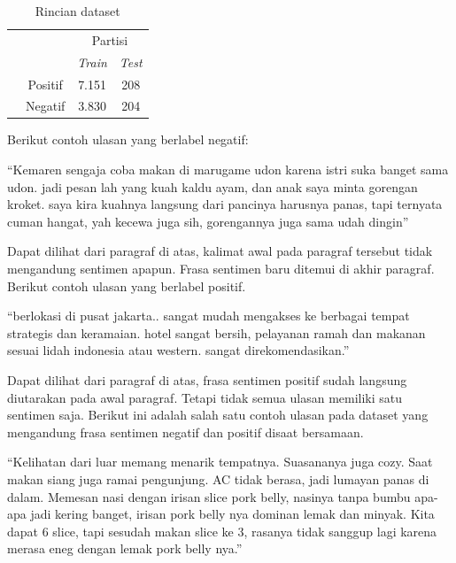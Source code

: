	\begin{table}[ht]
	    \centering
	    \caption{Rincian dataset \parencite{CrisdayantiPurwarianti2019}}
	    \begin{tabular}{@{}cc|cc@{}}
			\multicolumn{1}{c}{} &\multicolumn{1}{c}{} &\multicolumn{2}{c}{Partisi} \\ 
			\multicolumn{1}{c}{} & 
			\multicolumn{1}{c|}{} & 
			\multicolumn{1}{c}{\textit{Train}} & 
			\multicolumn{1}{c}{\textit{Test}} \\ 
			\cline{2-4}
			\multirow[c]{2}{*}{\rotatebox[origin=tr]{90}{Label}}
			& Positif  & 7.151 & 208   \\[1.5ex]
			& Negatif  & 3.830 &204   \\ 
			\cline{2-4}
	    \end{tabular}
	    \label{tab:detail_sentiment_b}
	\end{table}

	Berikut contoh ulasan yang berlabel negatif:

	“Kemaren sengaja coba makan di marugame udon karena istri suka banget sama udon. jadi pesan lah yang kuah kaldu ayam, dan anak saya minta gorengan kroket. saya kira kuahnya langsung dari pancinya harusnya panas, tapi ternyata cuman hangat, yah kecewa juga sih, gorengannya juga sama udah dingin” 

	Dapat dilihat dari paragraf di atas, kalimat awal pada paragraf tersebut tidak mengandung sentimen apapun. Frasa sentimen baru ditemui di akhir paragraf. Berikut contoh ulasan yang berlabel positif.

	“berlokasi di pusat jakarta.. sangat mudah mengakses ke berbagai tempat strategis dan keramaian. hotel sangat bersih, pelayanan ramah dan makanan sesuai lidah indonesia atau western. sangat direkomendasikan.”

	Dapat dilihat dari paragraf di atas, frasa sentimen positif sudah langsung diutarakan pada awal paragraf. Tetapi tidak semua ulasan memiliki satu sentimen saja. Berikut ini adalah salah satu contoh ulasan pada dataset yang mengandung frasa sentimen negatif dan positif disaat bersamaan. 

	“Kelihatan dari luar memang menarik tempatnya. Suasananya juga cozy. Saat makan siang juga ramai pengunjung. AC tidak berasa, jadi lumayan panas di dalam. Memesan nasi dengan irisan slice pork belly, nasinya tanpa bumbu apa- apa jadi kering banget, irisan pork belly nya dominan lemak dan minyak. Kita dapat 6 slice, tapi sesudah makan slice ke 3, rasanya tidak sanggup lagi karena merasa eneg dengan lemak pork belly nya.”

